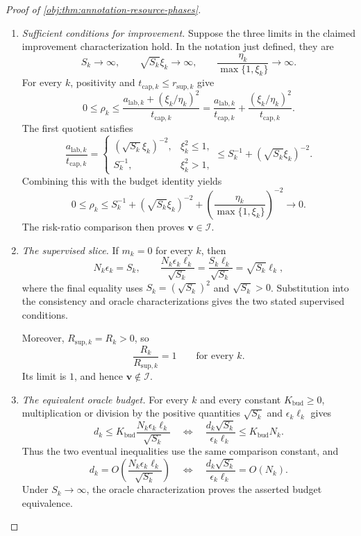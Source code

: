 \documentclass[11pt]{article}
\begin{document}
\begin{proof}[Proof of \cref{obj:thm:annotation-resource-phases}]
\begin{enumerate}
\item \emph{Sufficient conditions for improvement.}
Suppose the three limits in the claimed improvement characterization hold. In the notation just defined, they are
\[
S_k\longrightarrow\infty,\qquad
\sqrt{S_k}\xi_k\longrightarrow\infty,\qquad
\frac{\eta_k}{\max\{1,\xi_k\}}\longrightarrow\infty.
\]
For every \(k\), positivity and
\(t_{\mathrm{cap},k}\le r_{\mathrm{sup},k}\) give
\[
0\le\rho_k
\le
\frac{a_{\mathrm{lab},k}+(\xi_k/\eta_k)^2}
     {t_{\mathrm{cap},k}}
=
\frac{a_{\mathrm{lab},k}}{t_{\mathrm{cap},k}}
+
\frac{(\xi_k/\eta_k)^2}{t_{\mathrm{cap},k}}.
\]
The first quotient satisfies
\[
\frac{a_{\mathrm{lab},k}}{t_{\mathrm{cap},k}}
=
\begin{cases}
(\sqrt{S_k}\xi_k)^{-2},&\xi_k^2\le1,\\
S_k^{-1},&\xi_k^2>1,
\end{cases}
\le S_k^{-1}+(\sqrt{S_k}\xi_k)^{-2}.
\]
Combining this with the budget identity yields
\[
0\le\rho_k
\le
S_k^{-1}
+(\sqrt{S_k}\xi_k)^{-2}
+\left(\frac{\eta_k}{\max\{1,\xi_k\}}\right)^{-2}
\longrightarrow0.
\]
The risk-ratio comparison then proves
\(\mathbf v\in\mathcal I\).

\item \emph{The supervised slice.}
If \(m_k=0\) for every \(k\), then
\[
N_k\epsilon_k=S_k,\qquad
\frac{N_k\epsilon_k\ell_k}{\sqrt{S_k}}
=\frac{S_k\ell_k}{\sqrt{S_k}}
=\sqrt{S_k}\ell_k,
\]
where the final equality uses \(S_k=(\sqrt{S_k})^2\) and
\(\sqrt{S_k}>0\). Substitution into the consistency and oracle characterizations gives the two stated supervised conditions.

Moreover, \(R_{\mathrm{sup},k}=R_k>0\), so
\[
\frac{R_k}{R_{\mathrm{sup},k}}=1
\qquad\text{for every }k.
\]
Its limit is \(1\), and hence \(\mathbf v\notin\mathcal I\).

\item \emph{The equivalent oracle budget.}
For every \(k\) and every constant \(K_{\mathrm{bud}}\ge0\), multiplication or division by the positive quantities
\(\sqrt{S_k}\) and \(\epsilon_k\ell_k\) gives
\[
d_k\le K_{\mathrm{bud}}
\frac{N_k\epsilon_k\ell_k}{\sqrt{S_k}}
\quad\Longleftrightarrow\quad
\frac{d_k\sqrt{S_k}}{\epsilon_k\ell_k}
\le K_{\mathrm{bud}}N_k.
\]
Thus the two eventual inequalities use the same comparison constant, and
\[
d_k=O\!\left(\frac{N_k\epsilon_k\ell_k}{\sqrt{S_k}}\right)
\quad\Longleftrightarrow\quad
\frac{d_k\sqrt{S_k}}{\epsilon_k\ell_k}=O(N_k).
\]
Under \(S_k\to\infty\), the oracle characterization proves the asserted budget equivalence.


\end{enumerate}
\end{proof}
\end{document}
